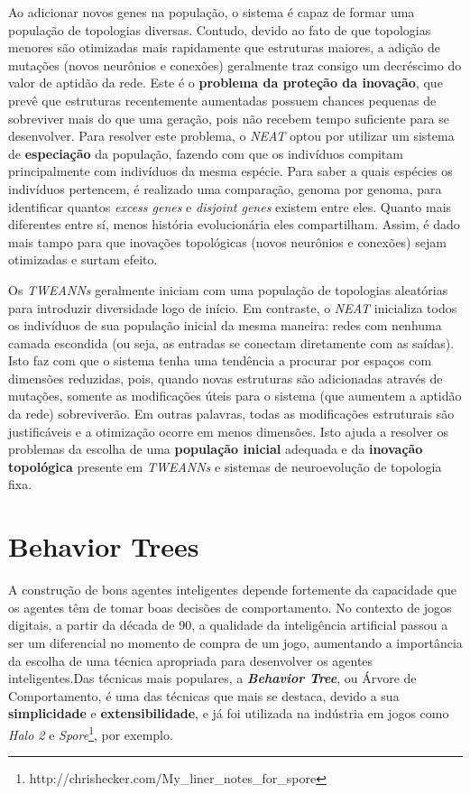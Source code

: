 Ao adicionar novos genes na população, o sistema é capaz de formar uma população
de topologias diversas. Contudo, devido ao fato de que topologias menores são
otimizadas mais rapidamente que estruturas maiores, a adição de mutações (novos
neurônios e conexões) geralmente traz consigo um decréscimo do valor de aptidão
da rede. Este é o \textbf{problema da proteção da inovação}, que prevê que
estruturas recentemente aumentadas possuem chances pequenas de sobreviver mais
do que uma geração, pois não recebem tempo suficiente para se desenvolver. Para
resolver este problema, o \textit{NEAT} optou por utilizar um sistema de
\textbf{especiação} da população, fazendo com que os indivíduos compitam
principalmente com indivíduos da mesma espécie. Para saber a quais espécies os
indivíduos pertencem, é realizado uma comparação, genoma por genoma, para
identificar quantos \textit{excess genes} e \textit{disjoint genes} existem
entre eles. Quanto mais diferentes entre sí, menos história evolucionária eles
compartilham. Assim, é dado mais tampo para que inovações topológicas (novos
neurônios e conexões) sejam otimizadas e surtam efeito.

Os \textit{TWEANNs} geralmente iniciam com uma população de topologias
aleatórias para introduzir diversidade logo de início. Em contraste, o
\textit{NEAT} inicializa todos os indivíduos de sua população inicial da mesma
maneira: redes com nenhuma camada escondida (ou seja, as entradas se conectam
diretamente com as saídas). Isto faz com que o sistema tenha uma tendência a
procurar por espaços com dimensões reduzidas, pois, quando novas estruturas são
adicionadas através de mutações, somente as modificações úteis para o sistema
(que aumentem a aptidão da rede) sobreviverão. Em outras palavras, todas as
modificações estruturais são justificáveis e a otimização ocorre em menos
dimensões. Isto ajuda a resolver os problemas da escolha de uma
\textbf{população inicial} adequada e da \textbf{inovação topológica} presente
em \textit{TWEANNs} e sistemas de neuroevolução de topologia fixa.

\section{\label{section:behavior-trees}Behavior Trees}
A construção de bons agentes inteligentes depende fortemente da capacidade que
os agentes têm de tomar boas decisões de comportamento. No contexto de jogos
digitais, a partir da década de 90, a qualidade da inteligência artificial
passou a ser um diferencial no momento de compra de um jogo\cite[Cap.
1]{Millington:2009:AIG:1795711}, aumentando a importância da escolha de uma
técnica apropriada para desenvolver os agentes inteligentes.Das técnicas mais
populares, a \textbf{\textit{Behavior Tree}}, ou Árvore de Comportamento, é uma
das técnicas que mais se destaca, devido a sua \textbf{simplicidade} e
\textbf{extensibilidade}\cite[Cap.  4]{Rabin:2013:GAP:2566761}, e já foi
utilizada na indústria em jogos como \textit{Halo 2}\cite[Cap.
5]{Millington:2009:AIG:1795711} e
\textit{Spore}\footnote{http://chrishecker.com/My\_liner\_notes\_for\_spore},
por exemplo.

